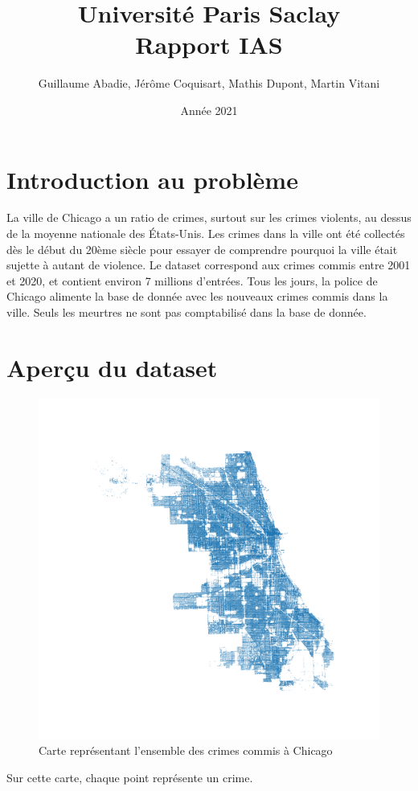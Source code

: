 \documentclass{article}
\title{\textbf{\Huge  Université Paris Saclay}\\ Rapport IAS}
\author{Guillaume Abadie, Jérôme Coquisart, Mathis Dupont, Martin Vitani}
\date{Année 2021}
\begin{document}
    \maketitle
    \tableofcontents
    \newpage

    \section{Introduction au problème}
    La ville de Chicago a un ratio de crimes, surtout sur les crimes violents, au dessus de la moyenne
    nationale des États-Unis.
    Les crimes dans la ville ont été collectés dès le début du 20ème siècle pour essayer de 
    comprendre pourquoi la ville était sujette à autant de violence.
    Le dataset correspond aux crimes commis entre 2001 et 2020, et contient environ 
    7 millions d'entrées.
    Tous les jours, la police de Chicago alimente la base de donnée avec les nouveaux crimes commis
    dans la ville. Seuls les meurtres ne sont pas comptabilisé dans la base de donnée.

    \section{Aperçu du dataset}
    \begin{figure}[H]
            \centering
	    \includegraphics[scale=.2]{carte_chicago.png}
	    \caption{Carte représentant l'ensemble des crimes commis à Chicago}
    \end{figure}
    Sur cette carte, chaque point représente un crime.
\end{document}
